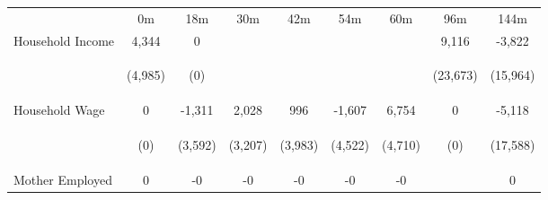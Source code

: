 \begin{tabular}{lcccccccc}
\hline \noalign{\smallskip} & 0m & 18m & 30m & 42m & 54m & 60m & 96m & 144m\\
\noalign{\smallskip}\hline \noalign{\smallskip}Household Income & 4,344 & 0 &  &  &  &  & 9,116 & -3,822\\
 & \begin{footnotesize}(4,985)\end{footnotesize} & \begin{footnotesize}(0)\end{footnotesize} & \begin{footnotesize}\end{footnotesize} & \begin{footnotesize}\end{footnotesize} & \begin{footnotesize}\end{footnotesize} & \begin{footnotesize}\end{footnotesize} & \begin{footnotesize}(23,673)\end{footnotesize} & \begin{footnotesize}(15,964)\end{footnotesize}\\
\noalign{\smallskip}Household Wage & 0 & -1,311 & 2,028 & 996 & -1,607 & 6,754 & 0 & -5,118\\
 & \begin{footnotesize}(0)\end{footnotesize} & \begin{footnotesize}(3,592)\end{footnotesize} & \begin{footnotesize}(3,207)\end{footnotesize} & \begin{footnotesize}(3,983)\end{footnotesize} & \begin{footnotesize}(4,522)\end{footnotesize} & \begin{footnotesize}(4,710)\end{footnotesize} & \begin{footnotesize}(0)\end{footnotesize} & \begin{footnotesize}(17,588)\end{footnotesize}\\
\noalign{\smallskip}Mother Employed & 0 & -0 & -0 & -0 & -0 & -0 &  & 0\\

\end{tabular}
